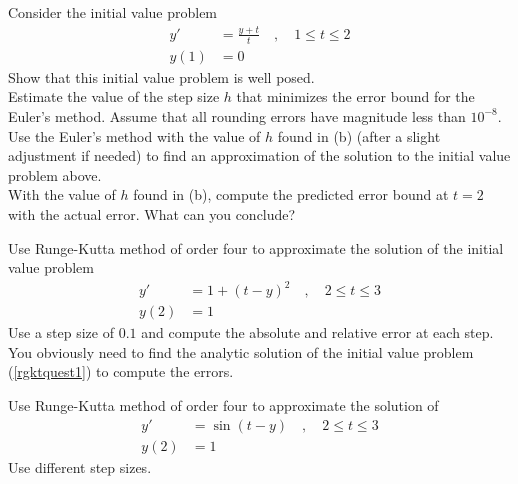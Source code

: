 \begin{question}
Consider the initial value problem
\begin{align*}
y' &= \frac{y + t}{t} \quad , \quad 1 \leq t \leq 2 \\
y(1) &= 0
\end{align*}
 Show that this initial value problem is well posed.\\
 Estimate the value of the step size $h$ that minimizes the error
bound for the Euler's method.  Assume that all rounding errors have
magnitude less than $10^{-8}$.\\
 Use the Euler's method with the value of $h$ found in (b)
(after a slight adjustment if needed) to find an approximation of the
solution to the initial value problem above.\\
 With the value of $h$ found in (b), compute the predicted
error bound at $t=2$ with the actual error.  What can you conclude?
\label{initQ3}
\end{question}

\begin{question}
Use Runge-Kutta method of order four to approximate the solution of
the initial value problem
\begin{equation}\label{rgktquest1}
\begin{split}
y' &= 1 + (t - y)^2    \quad , \quad  2 \leq t \leq 3 \\
y(2) &= 1
\end{split}
\end{equation}
Use a step size of $0.1$ and compute the absolute and relative error
at each step.  You obviously need to find the analytic solution of the
initial value problem (\ref{rgktquest1}) to compute the errors.
\label{initQ4}
\end{question}

\begin{question}
Use Runge-Kutta method of order four to approximate the solution of
\begin{align*}
y' &= \sin(t - y) \quad , \quad  2 \leq t \leq 3 \\
y(2) &= 1
\end{align*}
Use different step sizes.
\label{initQ5}
\end{question}

